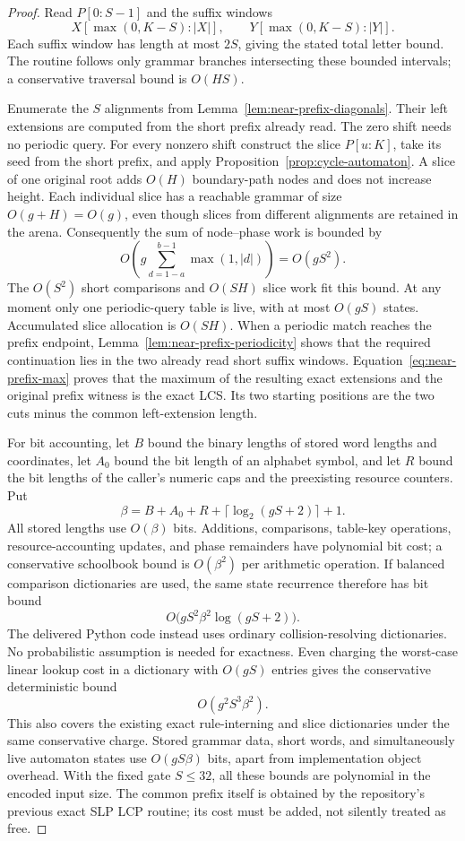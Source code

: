 \begin{proof}
Read $P[0:S-1]$ and the suffix windows
\[
 X[\max(0,K-S):|X|],\qquad
 Y[\max(0,K-S):|Y|].
\]
Each suffix window has length at most $2S$, giving the stated total
letter bound. The routine follows only grammar branches intersecting
these bounded intervals; a conservative traversal bound is $O(HS)$.

Enumerate the $S$ alignments from Lemma~\ref{lem:near-prefix-diagonals}.
Their left extensions are computed from the short prefix already read.
The zero shift needs no periodic query. For every nonzero shift construct
the slice $P[u:K]$, take its seed from the short prefix, and apply
Proposition~\ref{prop:cycle-automaton}. A slice of one original root adds
$O(H)$ boundary-path nodes and does not increase height. Each individual
slice has a reachable grammar of size $O(g+H)=O(g)$, even though slices
from different alignments are retained in the arena. Consequently the
sum of node--phase work is bounded by
\[
 O\!\left(g\sum_{d=1-a}^{b-1}\max(1,|d|)\right)=O(gS^2).
\]
The $O(S^2)$ short comparisons and $O(SH)$ slice work fit this bound.
At any moment only one periodic-query table is live, with at most
$O(gS)$ states. Accumulated slice allocation is $O(SH)$. When a periodic
match reaches the prefix endpoint, Lemma~\ref{lem:near-prefix-periodicity}
shows that the required continuation lies in the two already read short
suffix windows. Equation~\eqref{eq:near-prefix-max} proves that the maximum
of the resulting exact extensions and the original prefix witness is the
exact LCS. Its two starting positions are the two cuts minus the common
left-extension length.

For bit accounting, let $B$ bound the binary lengths of stored word
lengths and coordinates, let $A_0$ bound the bit length of an alphabet
symbol, and let $R$ bound the bit lengths of the caller's numeric caps
and the preexisting resource counters. Put
\[
 \beta=B+A_0+R+\lceil\log_2(gS+2)\rceil+1.
\]
All stored lengths use $O(\beta)$ bits. Additions, comparisons, table-key
operations, resource-accounting updates, and phase remainders have
polynomial bit cost; a conservative
schoolbook bound is $O(\beta^2)$ per arithmetic operation. If balanced
comparison dictionaries are used, the same state recurrence therefore
has bit bound
\[
 O\bigl(gS^2\beta^2\log(gS+2)\bigr).
\]
The delivered Python code instead uses ordinary collision-resolving
dictionaries. No probabilistic assumption is needed for exactness. Even
charging the worst-case linear lookup cost in a dictionary with
$O(gS)$ entries gives the conservative deterministic bound
\[
 O(g^2S^3\beta^2).
\]
This also covers the existing exact rule-interning and slice dictionaries
under the same conservative charge. Stored grammar data, short words,
and simultaneously live automaton states use $O(gS\beta)$ bits, apart
from implementation object overhead. With the fixed gate $S\le32$,
all these bounds are polynomial in the encoded input size. The common
prefix itself is obtained by the repository's previous exact SLP LCP
routine; its cost must be added, not silently treated as free.
\end{proof}

